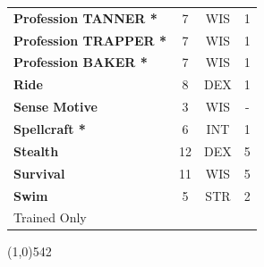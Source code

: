 \documentclass[letterpaper]{article}
\newcommand{\fullline}{\noindent\line(1,0){542} \\}
\begin{document}
\begin{table}[h!]
{{\begin{tabular}{l  c  c  c}
        \textbf{Profession {\scriptsize TANNER} *} & 7 & {\footnotesize WIS} & 1 \\
        \textbf{Profession {\scriptsize TRAPPER} *} & 7 & {\footnotesize WIS} & 1 \\
        \textbf{Profession {\scriptsize BAKER} *} & 7 & {\footnotesize WIS} & 1 \\
        \textbf{Ride} & 8 & {\footnotesize DEX} & 1 \\
        \textbf{Sense Motive} & 3 & {\footnotesize WIS} & - \\
        \textbf{Spellcraft *} & 6 & {\footnotesize INT} & 1 \\
        \textbf{Stealth} & 12 & {\footnotesize DEX} & 5 \\
        \textbf{Survival} & 11 & {\footnotesize WIS} & 5 \\
        \textbf{Swim} & 5 & {\footnotesize STR} & 2 \\
        {\footnotesize * Trained Only} \\
        \end{tabular}
    }
}
\vspace{-1.5em}
\end{table} \par

\vspace{-1.5em}
\fullline
\vspace{-1em}
\end{document}
